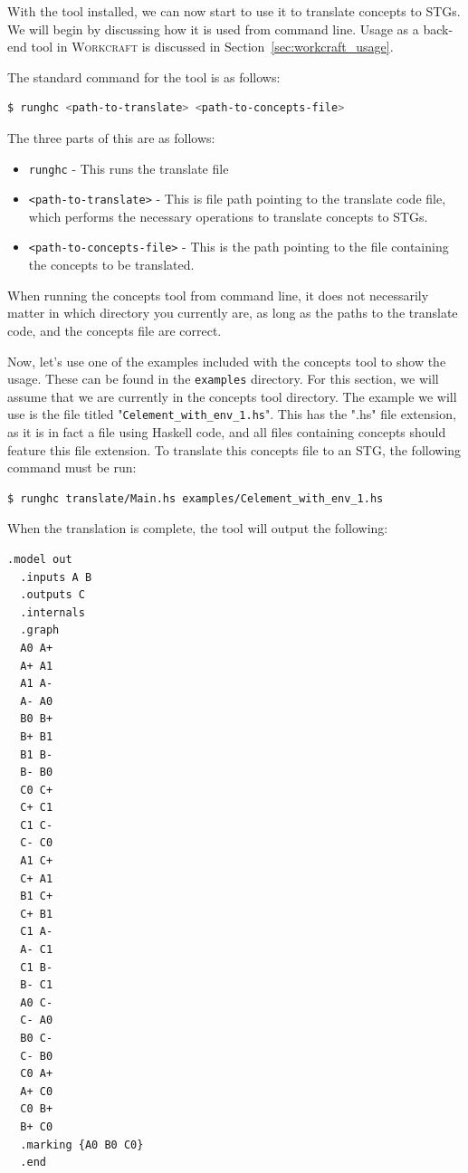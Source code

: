 \documentclass{proc}
\newcommand{\noun}[1]{\textsc{#1}}
\begin{document}
With the tool installed, we can now start to use it to translate concepts to STGs. We will begin by discussing how it is used from command line. Usage as a back-end tool in 
\noun{Workcraft} is discussed in Section~\ref{sec:workcraft_usage}.

The standard command for the tool is as follows:

\begin{lstlisting}[language=bash]
  $ runghc <path-to-translate> <path-to-concepts-file>
\end{lstlisting}

The three parts of this are as follows:
\begin{itemize}
  \item \texttt{runghc} - This runs the translate file
  \item \texttt{<path-to-translate>} - This is file path pointing to the translate code file, which performs the necessary operations to translate concepts to STGs.
  \item \texttt{<path-to-concepts-file>} - This is the path pointing to the file containing the concepts to be translated.
\end{itemize}

When running the concepts tool from command line, it does not necessarily matter in which directory you currently are, as long as the paths to the translate code, and the concepts
file are correct.  

Now, let's use one of the examples included with the concepts tool to show the usage. These can be found in the \texttt{examples} directory. For this section, we will assume that we are 
currently in the concepts tool directory. The example we will use is the file titled "\texttt{Celement\_with\_env\_1.hs}". This has the ".hs" file extension, as it is in fact a file using Haskell 
code, and all files containing concepts should feature this file extension. To translate this concepts file to an STG, the following command must be run:

\begin{lstlisting}[language=bash]
  $ runghc translate/Main.hs examples/Celement_with_env_1.hs
\end{lstlisting}

When the translation is complete, the tool will output the following:

\begin{lstlisting}[language=bash]
  .model out
  .inputs A B
  .outputs C
  .internals
  .graph
  A0 A+
  A+ A1
  A1 A-
  A- A0
  B0 B+
  B+ B1
  B1 B-
  B- B0
  C0 C+
  C+ C1
  C1 C-
  C- C0
  A1 C+
  C+ A1
  B1 C+
  C+ B1
  C1 A-
  A- C1
  C1 B-
  B- C1
  A0 C-
  C- A0
  B0 C-
  C- B0
  C0 A+
  A+ C0
  C0 B+
  B+ C0
  .marking {A0 B0 C0}
  .end
\end{lstlisting}
\end{document}
